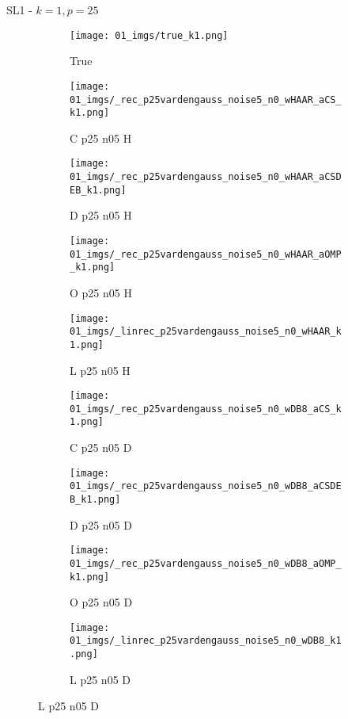 \begin{frame}{SL1 - $k=1,p=25$}{}
\begin{figure}
\begin{subfigure}{0.1\textwidth}
\texttt{[image: 01\_imgs/true\_k1.png]}
\caption*{\Tiny True}
\end{subfigure}
\begin{subfigure}{0.1\textwidth}
\texttt{[image: 01\_imgs/\_rec\_p25vardengauss\_noise5\_n0\_wHAAR\_aCS\_k1.png]}
\caption*{\Tiny C p25 n05 H}
\end{subfigure}
\begin{subfigure}{0.1\textwidth}
\texttt{[image: 01\_imgs/\_rec\_p25vardengauss\_noise5\_n0\_wHAAR\_aCSDEB\_k1.png]}
\caption*{\Tiny D p25 n05 H}
\end{subfigure}
\begin{subfigure}{0.1\textwidth}
\texttt{[image: 01\_imgs/\_rec\_p25vardengauss\_noise5\_n0\_wHAAR\_aOMP\_k1.png]}
\caption*{\Tiny O p25 n05 H}
\end{subfigure}
\begin{subfigure}{0.1\textwidth}
\texttt{[image: 01\_imgs/\_linrec\_p25vardengauss\_noise5\_n0\_wHAAR\_k1.png]}
\caption*{\Tiny L p25 n05 H}
\end{subfigure}
\begin{subfigure}{0.1\textwidth}
\texttt{[image: 01\_imgs/\_rec\_p25vardengauss\_noise5\_n0\_wDB8\_aCS\_k1.png]}
\caption*{\Tiny C p25 n05 D}
\end{subfigure}
\begin{subfigure}{0.1\textwidth}
\texttt{[image: 01\_imgs/\_rec\_p25vardengauss\_noise5\_n0\_wDB8\_aCSDEB\_k1.png]}
\caption*{\Tiny D p25 n05 D}
\end{subfigure}
\begin{subfigure}{0.1\textwidth}
\texttt{[image: 01\_imgs/\_rec\_p25vardengauss\_noise5\_n0\_wDB8\_aOMP\_k1.png]}
\caption*{\Tiny O p25 n05 D}
\end{subfigure}
\begin{subfigure}{0.1\textwidth}
\texttt{[image: 01\_imgs/\_linrec\_p25vardengauss\_noise5\_n0\_wDB8\_k1.png]}
\caption*{\Tiny L p25 n05 D}
\end{subfigure}

\vspace{5pt}


\end{figure}
\end{frame}
